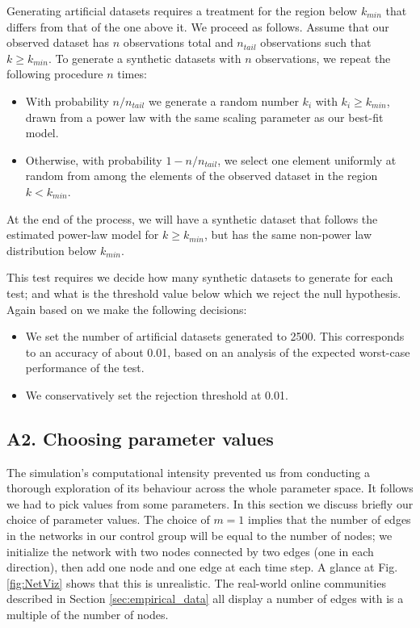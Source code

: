 \documentclass{article}
\begin{document}
Generating artificial datasets requires a treatment for the region below $k_{min}$  that differs from that of the one above it. We proceed as follows. Assume that our observed dataset has $n$ observations total and $n_{tail}$ observations such that $k \geq k_{min}$. To generate a synthetic datasets with $n$ observations, we repeat the following procedure $n$ times:
\begin{itemize}
\item With probability $n/n_{tail}$ we generate a random number $k_i$ with $k_i \geq k_{min}$, drawn from a power law with the same scaling parameter as our best-fit model.
\item Otherwise, with probability $1 - n/n_{tail}$, we select one element uniformly at random from among the elements of the observed dataset in the region $k<k_{min}$.
\end{itemize}

At the end of the process, we will have a synthetic dataset that follows the estimated power-law model for $k \geq k_{min}$, but has the same non-power law distribution below $k_{min}$.

This test requires we decide how many synthetic datasets to generate for each test; and what is the threshold value below which we reject the null hypothesis. Again based on \cite{clauset2009power} we make the following decisions:

\begin{itemize}
\item We set the number of artificial datasets generated to 2500. This corresponds to an accuracy of about 0.01, based on an analysis of the expected worst-case performance of the test. 
\item We conservatively set the rejection threshold at 0.01.
\end{itemize}

\subsection*{A2. Choosing parameter values}

The simulation's computational intensity prevented us from conducting a thorough exploration of its behaviour across the whole parameter space. It follows we had to pick values from some parameters. In this section we discuss briefly our choice of parameter values.
The choice of $m=1$ implies that the number of edges in the networks in our control group will be equal to the number of nodes; we initialize the network with two nodes connected by two edges (one in each direction), then add one node and one edge at each time step. A glance at  Fig.\,\ref{fig:NetViz} shows that this is unrealistic. The real-world online communities described in Section \ref{sec:empirical_data} all display a number of edges with is a multiple of the number of nodes. 
\end{document}
